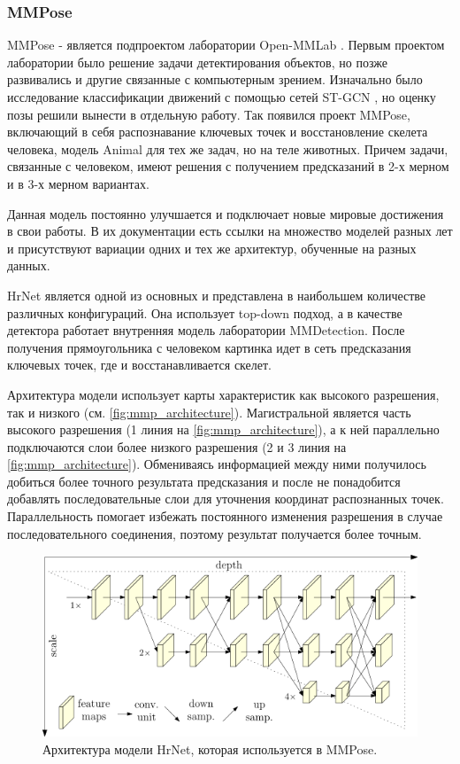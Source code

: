 \subsubsection{MMPose}
\label{subsubsec:mmpose_desc}

MMPose - является подпроектом лаборатории Open-MMLab \cite{mmpose2020}. Первым проектом лаборатории было решение задачи детектирования объектов, но позже развивались и другие связанные с компьютерным зрением. Изначально было исследование классификации движений с помощью сетей ST-GCN \cite{STGCN}, но оценку позы решили вынести в отдельную работу. Так появился проект MMPose, включающий в себя распознавание ключевых точек и восстановление скелета человека, модель Animal для тех же задач, но на теле животных. Причем задачи, связанные с человеком, имеют решения с получением предсказаний в 2-х мерном и в 3-х мерном вариантах.

Данная модель постоянно улучшается и подключает новые мировые достижения в свои работы. В их документации есть ссылки на множество моделей разных лет и присутствуют вариации одних и тех же архитектур, обученные на разных данных.

HrNet \cite{HRNET} является одной из основных и представлена в наибольшем количестве различных конфигураций. Она использует top-down подход, а в качестве детектора работает внутренняя модель лаборатории MMDetection. После получения прямоугольника с человеком картинка идет в сеть предсказания ключевых точек, где и восстанавливается скелет.

Архитектура модели использует карты характеристик как высокого разрешения, так и низкого (см. \autoref{fig:mmp_architecture}). Магистральной является часть высокого разрешения (1 линия на \autoref{fig:mmp_architecture}), а к ней параллельно подключаются слои более низкого разрешения (2 и 3 линия на \autoref{fig:mmp_architecture}). Обмениваясь информацией между ними получилось добиться более точного результата предсказания и после не понадобится добавлять последовательные слои для уточнения координат распознанных точек. Параллельность помогает избежать постоянного изменения разрешения в случае последовательного соединения, поэтому результат получается более точным.

\begin{figure}[h]
	\centering
	\includegraphics[width=\textwidth * 4 / 5]{./images/MMPose/architecture}
	\caption{Архитектура модели HrNet, которая используется в MMPose. \cite{HRNET}}
	\label{fig:mmp_architecture}
\end{figure}


